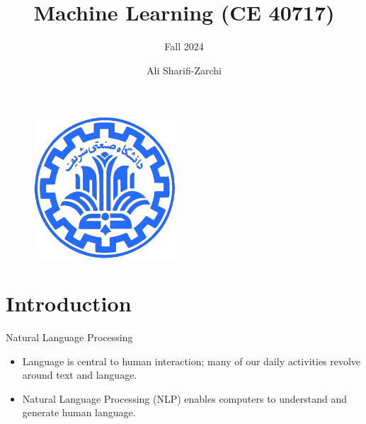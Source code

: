 \documentclass[serif, aspectratio=169]{beamer}
\author{Ali Sharifi-Zarchi}
\title{Machine Learning (CE 40717)}
\subtitle{Fall 2024}
\institute{
    CE Department \\
    Sharif University of Technology
}
\begin{document}
\begin{frame}
    \titlepage
    \vspace*{-0.6cm}
    \begin{figure}[htpb]
        \begin{center}
            \includegraphics[keepaspectratio, scale=0.25]{pic/sharif-main-logo.png}
        \end{center}
    \end{figure}
\end{frame}

\begin{frame}    
\tableofcontents[sectionstyle=show,
subsectionstyle=show/shaded/hide,
subsubsectionstyle=show/shaded/hide]
\end{frame}



\section{Introduction}


\begin{frame}{Natural Language Processing}
	\begin{itemize}
		\item Language is central to human interaction; many of our daily activities revolve around text and language.
		\item Natural Language Processing (NLP) enables computers to understand and generate human language.
	\end{itemize}
\end{frame}
\end{document}
